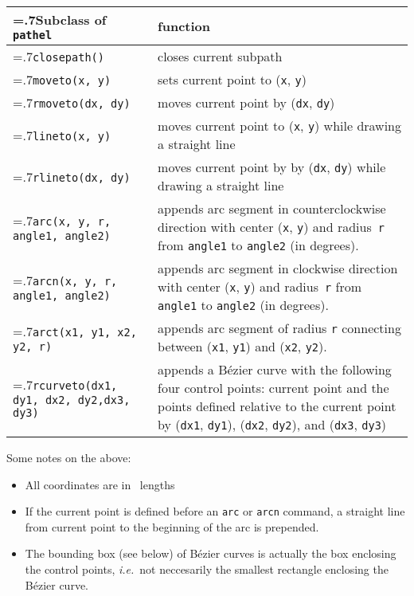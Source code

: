 \medskip
\begin{tabularx}{\linewidth}{>{\hsize=.7\hsize}X>{\raggedright\arraybackslash\hsize=1.3\hsize}X}
Subclass of \texttt{pathel} & function \\
\hline
\texttt{closepath()} & closes current subpath \\
\texttt{moveto(x, y)} & sets current point to (\texttt{x},
\texttt{y})\\
\texttt{rmoveto(dx, dy)} & moves current point by (\texttt{dx},
\texttt{dy})\\
\texttt{lineto(x, y)} & moves current point to (\texttt{x}, \texttt{y})
while drawing a straight line\\
\texttt{rlineto(dx, dy)} & moves current point by by (\texttt{dx}, \texttt{dy})
while drawing a straight line\\
\texttt{arc(x, y, r, \newline\phantom{arc(}angle1, angle2)} & appends arc segment in
counterclockwise direction with center (\texttt{x}, \texttt{y}) and
radius~\texttt{r} from \texttt{angle1} to \texttt{angle2} (in degrees).\\
\texttt{arcn(x, y, r, \newline\phantom{arcn(}angle1, angle2)} & appends arc segment in
clockwise direction with center (\texttt{x}, \texttt{y}) and
radius~\texttt{r} from \texttt{angle1} to \texttt{angle2} (in degrees). \\
\texttt{arct(x1, y1, x2, y2, r)} & appends arc segment of radius \texttt{r}
connecting between (\texttt{x1}, \texttt{y1}) and (\texttt{x2}, \texttt{y2}).\\
\texttt{rcurveto(dx1, dy1, \newline\phantom{rcurveto(}dx2, dy2,\newline\phantom{rcurveto(}dx3, dy3)} & appends a B\'ezier curve with
the following four control points: current point and the points defined 
relative to the current point by (\texttt{dx1}, \texttt{dy1}), 
(\texttt{dx2}, \texttt{dy2}), and (\texttt{dx3}, \texttt{dy3})
\end{tabularx}
\medskip

Some notes on the above:
\begin{itemize}
\item All coordinates are in \PyX\ lengths
\item If the current point is defined before an \verb|arc| or
  \verb|arcn| command, a straight line from current point to the
  beginning of the arc is prepended.
\item The bounding box (see below) of B\'ezier curves is actually 
  the box enclosing the control points, \textit{i.e.}\ not neccesarily the 
  smallest rectangle enclosing the B\'ezier curve.
\end{itemize}


